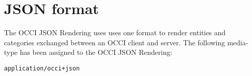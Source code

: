 \documentclass[10pt,a4paper]{article}
\begin{document}
%
%
%
%
%
%

\section{JSON format}
\label{sec:json_format}
The OCCI JSON Rendering uses uses one format to render entities and categories
exchanged between an OCCI client and server.
The following media-type has been assigned to the OCCI JSON Rendering:

{\tt application/occi+json}


%
%
%
\end{document}
